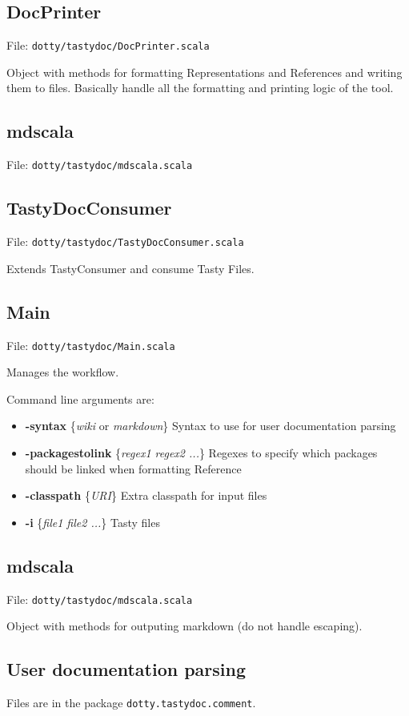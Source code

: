 \documentclass{report}
\begin{document}
\subsection{DocPrinter}
File: \texttt{dotty/tastydoc/DocPrinter.scala}

Object with methods for formatting Representations and References and writing them to files. Basically handle all the formatting and printing logic of the tool.

\subsection{mdscala}
File: \texttt{dotty/tastydoc/mdscala.scala}

\subsection{TastyDocConsumer}
File: \texttt{dotty/tastydoc/TastyDocConsumer.scala}

Extends TastyConsumer and consume Tasty Files.

\subsection{Main}
File: \texttt{dotty/tastydoc/Main.scala}

Manages the workflow.

Command line arguments are:
\begin{itemize}
    \item \textbf{-syntax} \{\textit{wiki} or \textit{markdown}\} Syntax to use for user documentation parsing
    \item \textbf{-packagestolink} \{\textit{regex1 regex2 ...}\} Regexes to specify which packages should be linked when formatting Reference
    \item \textbf{-classpath} \{\textit{URI}\} Extra classpath for input files
    \item \textbf{-i} \{\textit{file1 file2 ...}\} Tasty files
\end{itemize}

\subsection{mdscala}
File: \texttt{dotty/tastydoc/mdscala.scala}

Object with methods for outputing markdown (do not handle escaping).

\subsection{User documentation parsing}
Files are in the package \texttt{dotty.tastydoc.comment}.
\end{document}
